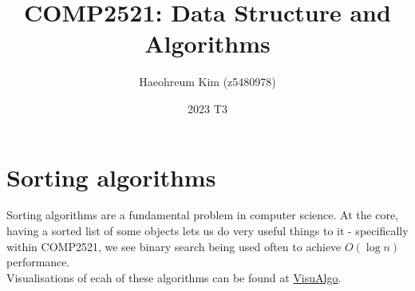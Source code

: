 \documentclass[14]{article}
\title{COMP2521: Data Structure and Algorithms}
\author{Haeohreum Kim (z5480978)}
\date{2023 T3}
\begin{document}
\begin{titlingpage}
\maketitle
\end{titlingpage}
\newpage
\section{Sorting algorithms}
Sorting algorithms are a fundamental problem in computer science. At the core, having a sorted list of some objects lets us
do very useful things to it - specifically within COMP2521, we see binary search being used often to achieve $O(\log n)$ performance. \\ 
Visualisations of ecah of these algorithms can be found at \href{https://visualgo.net/en/sorting}{VisuAlgo}.
\end{document}
